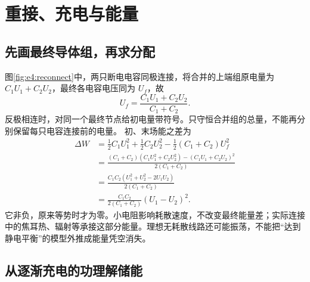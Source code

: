 \section{重接、充电与能量}
\subsection{先画最终导体组，再求分配}

图\ref{fig:e4:reconnect}中，两只断电电容同极连接，将合并的上端组原电量为 $C_1U_1+C_2U_2$，最终各电容电压同为 $U_f$，故
\[
 U_f=\frac{C_1U_1+C_2U_2}{C_1+C_2}.
\]
反极相连时，对同一个最终节点给初电量带符号。只守恒合并组的总量，不能再分别保留每只电容连接前的电量。
初、末场能之差为
\[
\begin{aligned}
 \Delta W&=\frac12C_1U_1^2+\frac12C_2U_2^2
 -\frac12(C_1+C_2)U_f^2\\
 &=\frac{(C_1+C_2)(C_1U_1^2+C_2U_2^2)-(C_1U_1+C_2U_2)^2}
 {2(C_1+C_2)}\\
 &=\frac{C_1C_2(U_1^2+U_2^2-2U_1U_2)}{2(C_1+C_2)}\\
 &=\frac{C_1C_2}{2(C_1+C_2)}(U_1-U_2)^2.
\end{aligned}
\]
它非负，原来等势时才为零。小电阻影响耗散速度，不改变最终能量差；实际连接中的焦耳热、辐射等承接这部分能量。理想无耗散线路还可能振荡，不能把“达到静电平衡”的模型外推成能量凭空消失。

\subsection{从逐渐充电的功理解储能}

